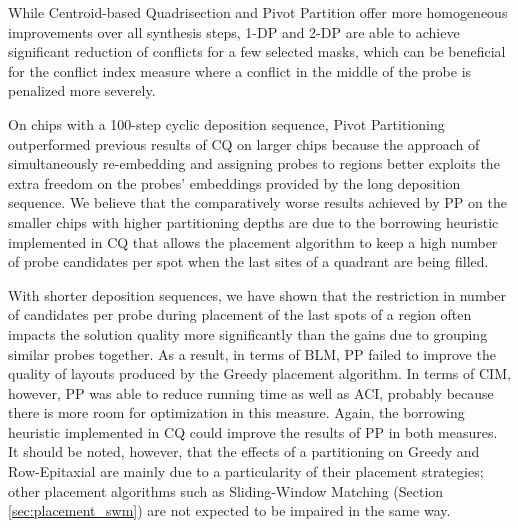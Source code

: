 While Centroid-based Quadrisection and Pivot Partition offer more homogeneous
improvements over all synthesis steps, 1-DP and 2-DP are able to achieve
significant reduction of conflicts for a few selected masks, which can be
beneficial for the conflict index measure where a conflict in the middle of the
probe is penalized more severely.

On chips with a 100-step cyclic deposition sequence, Pivot Partitioning
outperformed previous results of CQ on larger chips because the approach of
simultaneously re-embedding and assigning probes to regions better exploits the
extra freedom on the probes' embeddings provided by the long deposition
sequence. We believe that the comparatively worse results achieved by PP on the
smaller chips with higher partitioning depths are due to the borrowing heuristic
implemented in CQ that allows the placement algorithm to keep a high number of
probe candidates per spot when the last sites of a quadrant are being filled.

With shorter deposition sequences, we have shown that the restriction in number
of candidates per probe during placement of the last spots of a region often
impacts the solution quality more significantly than the gains due to grouping
similar probes together. As a result, in terms of BLM, PP failed to improve the
quality of layouts produced by the Greedy placement algorithm. In terms of CIM,
however, PP was able to reduce running time as well as ACI, probably because
there is more room for optimization in this measure. Again, the borrowing
heuristic implemented in CQ could improve the results of PP in both measures. It
should be noted, however, that the effects of a partitioning on Greedy and
Row-Epitaxial are mainly due to a particularity of their placement strategies;
other placement algorithms such as Sliding-Window Matching (Section
\ref{sec:placement_swm}) are not expected to be impaired in the same way.
